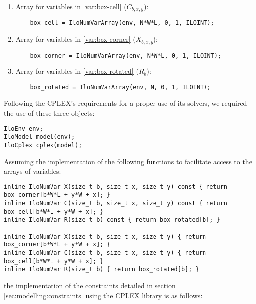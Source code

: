 \begin{enumerate}
	\item Array for variables in \ref{var:box-cell} ($C_{b,x,y}$):
    
	{\NOINDENT \begin{lstlisting}
	box_cell = IloNumVarArray(env, N*W*L, 0, 1, ILOINT);
	\end{lstlisting}}
    
	\item Array for variables in \ref{var:box-corner} ($X_{b,x,y}$):
    
	{\NOINDENT \begin{lstlisting}
	box_corner = IloNumVarArray(env, N*W*L, 0, 1, ILOINT);
	\end{lstlisting}}
    
	\item Array for variables in \ref{var:box-rotated} ($R_b$):
    
	{\NOINDENT \begin{lstlisting}
	box_rotated = IloNumVarArray(env, N, 0, 1, ILOINT);
	\end{lstlisting}}
    
\end{enumerate}

Following the CPLEX's requirements for a proper use of its solvers, we required the
use of these three objects:

{\NOINDENT \begin{lstlisting}
IloEnv env;
IloModel model(env);
IloCplex cplex(model);
\end{lstlisting}}

Assuming the implementation of the following functions to facilitate
access to the arrays of variables:

{\NOINDENT \begin{lstlisting}
inline IloNumVar X(size_t b, size_t x, size_t y) const { return box_corner[b*W*L + y*W + x]; }
inline IloNumVar C(size_t b, size_t x, size_t y) const { return box_cell[b*W*L + y*W + x]; }
inline IloNumVar R(size_t b) const { return box_rotated[b]; }

inline IloNumVar X(size_t b, size_t x, size_t y) { return box_corner[b*W*L + y*W + x]; }
inline IloNumVar C(size_t b, size_t x, size_t y) { return box_cell[b*W*L + y*W + x]; }
inline IloNumVar R(size_t b) { return box_rotated[b]; }
\end{lstlisting}}

the implementation of the constraints detailed in section \ref{sec:modelling:constraints}
using the CPLEX library is as follows:

